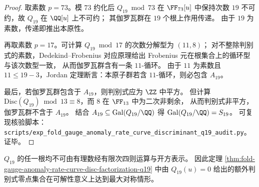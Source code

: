 \begin{proof}
取素数 \(p=73\)。模 \(73\) 约化后 \(Q_{19}\bmod 73\) 在 \(\FF_{73}[u]\) 中保持次数 \(19\) 不可约，故 \(Q_{19}\) 在 \(\QQ[u]\) 上不可约；
其伽罗瓦群在 \(19\) 个根上作用传递。
由于 \(19\) 为素数，传递即推出本原性。
\par
再取素数 \(p=17\)。可计算 \(Q_{19}\bmod 17\) 的次数分解型为 \((11,8)\)；
对不整除判别式的素数，Dedekind--Frobenius 对应原理给出 Frobenius 元在根集合上的循环型与该次数型一致，
从而伽罗瓦群含有一条 \(11\)-循环。
由于 \(11\) 为素数且 \(11\le 19-3\)，Jordan 定理断言：本原子群若含 \(11\)-循环，则必包含 \(A_{19}\)。
\par
最后，若伽罗瓦群包含于 \(A_{19}\)，则判别式应为 \(\ZZ\) 中平方。
但计算 \(\mathrm{Disc}(Q_{19})\bmod 13\equiv 8\)，而 \(8\) 在 \(\FF_{13}\) 中为二次非剩余，
从而判别式非平方，伽罗瓦群不含于 \(A_{19}\)。
结合 \(A_{19}\subseteq \mathrm{Gal}(Q_{19}/\QQ)\) 得
\(\mathrm{Gal}(Q_{19}/\QQ)=S_{19}\)。
可复现核验脚本：\texttt{scripts/exp\_fold\_gauge\_anomaly\_rate\_curve\_discriminant\_q19\_audit.py}。证毕。
\end{proof}

\begin{corollary}[根的不可根式性]\label{cor:fold-gauge-anomaly-q19-nonradical}
\(Q_{19}\) 的任一根均不可由有理数经有限次四则运算与开方表示。
因此定理 \ref{thm:fold-gauge-anomaly-rate-curve-disc-factorization-q19} 中由 \(Q_{19}(u)=0\) 给出的额外判别式零点集合在可解性意义上达到最大对称情形。
\end{corollary}

\endinput
